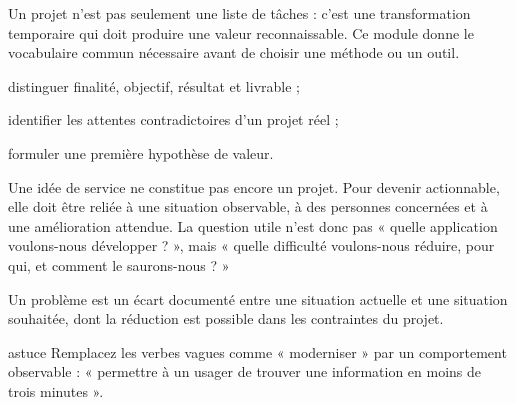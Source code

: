 \documentclass[12pt,twoside]{upbcours}
\begin{document}
\introduction
\begin{survol}
  Un projet n'est pas seulement une liste de tâches : c'est une transformation temporaire
  qui doit produire une valeur reconnaissable. Ce module donne le vocabulaire commun nécessaire
  avant de choisir une méthode ou un outil.
\end{survol}
\begin{objectifs}
  \item distinguer finalité, objectif, résultat et livrable ;
  \item identifier les attentes contradictoires d'un projet réel ;
  \item formuler une première hypothèse de valeur.
\end{objectifs}
\begin{concepts}
\end{concepts}
Une idée de service ne constitue pas encore un projet. Pour devenir actionnable, elle doit être
reliée à une situation observable, à des personnes concernées et à une amélioration attendue.
La question utile n'est donc pas « quelle application voulons-nous développer ? », mais
« quelle difficulté voulons-nous réduire, pour qui, et comment le saurons-nous ? »
\begin{definition}
  Un problème est un écart documenté entre une situation actuelle et une situation souhaitée,
  dont la réduction est possible dans les contraintes du projet.
\end{definition}
\begin{icone}{astuce}
  Remplacez les verbes vagues comme « moderniser » par un comportement observable :
  « permettre à un usager de trouver une information en moins de trois minutes ».
\end{icone}
\end{document}
